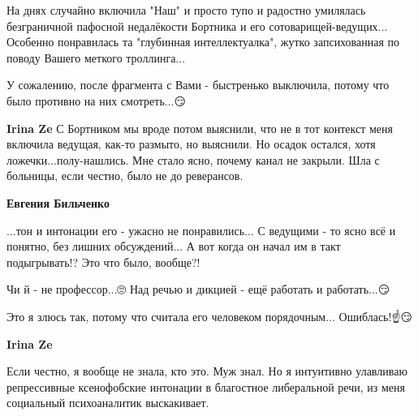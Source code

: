 \begin{itemize}
На днях случайно включила "Наш" и просто тупо и радостно умилялась безграничной
пафосной недалёкости Бортника и его сотоварищей-ведущих... Особенно понравилась
та "глубинная интеллектуалка", жутко запсихованная по поводу Вашего меткого
троллинга...

У сожалению, после фрагмента с Вами - быстренько выключила, потому что было
противно на них смотреть...😏🤦

\begin{itemize}
 
\textbf{Irina Ze} С Бортником мы вроде потом выяснили, что не в тот контекст
меня включила ведущая, как-то размыто, но выяснили. Но осадок остался, хотя
ложечки...полу-нашлись. Мне стало ясно, почему канал не закрыли. Шла с
больницы, если честно, было не до реверансов.

 
\textbf{Евгения Бильченко}

...тон и интонации его - ужасно не понравились... С ведущими - то ясно всё и
понятно, без лишних обсуждений... А вот когда он начал им в такт подыгрывать!?
Это что было, вообще?!

Чи й - не профессор...🙄 Над речью и дикцией - ещё работать и работать...😏

Это я злюсь так, потому что считала его человеком порядочным... Ошиблась!☝️😏

 
\textbf{Irina Ze} 

Если честно, я вообще не знала, кто это. Муж знал. Но я интуитивно улавливаю
репрессивные ксенофобские интонации в благостное либеральной речи, из меня
социальный психоаналитик выскакивает.

 

\end{itemize}
\end{itemize}
